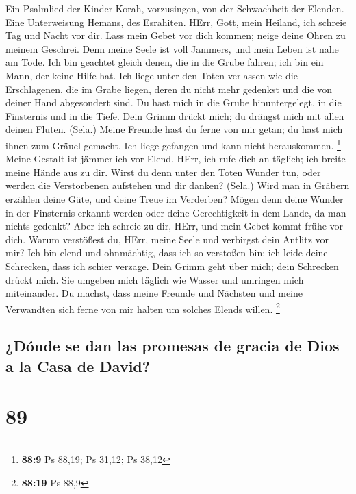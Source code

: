  Ein Psalmlied der Kinder Korah, vorzusingen, von der
Schwachheit der Elenden. Eine Unterweisung Hemans, des Esrahiten.
 HErr, Gott, mein Heiland, ich schreie Tag und Nacht vor
dir.  Lass mein Gebet vor dich kommen; neige deine Ohren
zu meinem Geschrei.  Denn meine Seele ist voll Jammers,
und mein Leben ist nahe am Tode.  Ich bin geachtet gleich
denen, die in die Grube fahren; ich bin ein Mann, der keine Hilfe hat.
 Ich liege unter den Toten verlassen wie die Erschlagenen,
die im Grabe liegen, deren du nicht mehr gedenkst und die von deiner
Hand abgesondert sind.  Du hast mich in die Grube
hinuntergelegt, in die Finsternis und in die Tiefe.  Dein
Grimm drückt mich; du drängst mich mit allen deinen Fluten. (Sela.)
 Meine Freunde hast du ferne von mir getan; du hast mich
ihnen zum Gräuel gemacht. Ich liege gefangen und kann nicht
herauskommen. \footnote{\textbf{88:9} Ps 88,19; Ps 31,12; Ps 38,12}
 Meine Gestalt ist jämmerlich vor Elend. HErr, ich rufe
dich an täglich; ich breite meine Hände aus zu dir. 
Wirst du denn unter den Toten Wunder tun, oder werden die Verstorbenen
aufstehen und dir danken? (Sela.)  Wird man in Gräbern
erzählen deine Güte, und deine Treue im Verderben?  Mögen
denn deine Wunder in der Finsternis erkannt werden oder deine
Gerechtigkeit in dem Lande, da man nichts gedenkt?  Aber
ich schreie zu dir, HErr, und mein Gebet kommt frühe vor dich.
 Warum verstößest du, HErr, meine Seele und verbirgst
dein Antlitz vor mir?  Ich bin elend und ohnmächtig, dass
ich so verstoßen bin; ich leide deine Schrecken, dass ich schier
verzage.  Dein Grimm geht über mich; dein Schrecken
drückt mich.  Sie umgeben mich täglich wie Wasser und
umringen mich miteinander.  Du machst, dass meine Freunde
und Nächsten und meine Verwandten sich ferne von mir halten um solches
Elends willen. \footnote{\textbf{88:19} Ps 88,9}

\hypertarget{duxf3nde-se-dan-las-promesas-de-gracia-de-dios-a-la-casa-de-david}{%
\subsection{¿Dónde se dan las promesas de gracia de Dios a la Casa de
David?}\label{duxf3nde-se-dan-las-promesas-de-gracia-de-dios-a-la-casa-de-david}}

\hypertarget{section-88}{%
\section{89}\label{section-88}}

